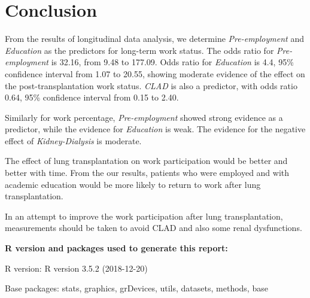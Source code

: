\documentclass[11pt, a4paper]{article}\usepackage[]{graphicx}\usepackage[]{color}
\newcommand{\prog}[1]{\textsf{#1}}
\begin{document}
{\clearpage
\section{Conclusion} \label{sec:conclu}
From the results of longitudinal data analysis, we determine \textit{Pre-employment} and  \textit{Education} as the predictors for long-term work status. The odds ratio for \textit{Pre-employment} is 32.16, from 9.48 to 177.09. Odds ratio for \textit{Education} is 4.4, 95\% confidence interval from 1.07 to 20.55, showing moderate evidence of the effect on the post-transplantation work status. \textit{CLAD} is also a predictor, with odds ratio 0.64, 95\% confidence interval from 0.15 to 2.40.

Similarly for work percentage, \textit{Pre-employment} showed strong evidence as a predictor, while the evidence for \textit{Education} is weak. The evidence for the negative effect of \textit{Kidney-Dialysis} is moderate.

The effect of lung transplantation on work participation would be better and better with time. From the our results, patients who were employed and with academic education would be more likely to return to work after lung transplantation.

In an attempt to improve the work participation after lung transplantation, measurements should be taken to avoid CLAD and also some renal dysfunctions.


\vspace{2cm}
\nocite{R}




\vfill

\footnotesize






\vfill

\footnotesize{{\bf \prog{R} version and packages used to generate this report:}

\prog{R} version: \textsf{R version 3.5.2 (2018-12-20)}

Base packages: \textsf{stats, graphics, grDevices, utils, datasets, methods, base}

}}
\end{document}
